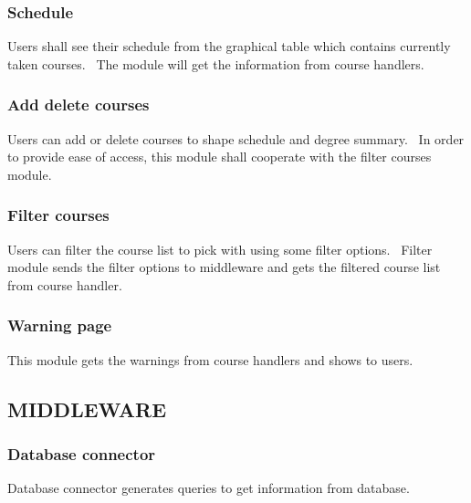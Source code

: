 \documentclass[twoside,letterpaper]{article}
\begin{document}
\subsubsection[Schedule]{\rmfamily\bfseries\color{black}
Schedule}
{\color{black}
{Users shall see their schedule from the graphical table which contains currently taken courses. \ The module will get the information from course handlers.}}

\subsubsection[Add delete courses]{\rmfamily\bfseries\color{black}
Add delete courses}
{\color{black}
{Users can add or delete courses to shape schedule and degree summary. \ In order to provide ease of access, this module shall cooperate with the filter courses module.}}

\subsubsection[Filter courses]{\rmfamily\bfseries\color{black}
Filter courses}
{\color{black}
{Users can filter the course list to pick with using some filter options. \ Filter module sends the filter options to middleware and gets the filtered course list from course handler. }}

\subsubsection[Warning page]{\rmfamily\bfseries\color{black}
Warning page}
{\color{black}
{This module gets the warnings from course handlers and shows to users. }}

\subsection[MIDDLEWARE]{\rmfamily\bfseries\color{black}
MIDDLEWARE}
\subsubsection[Database connector]{\rmfamily\bfseries\color{black}
Database connector}
{\color{black}
{Database connector generates queries to get information from database.}}
\end{document}
